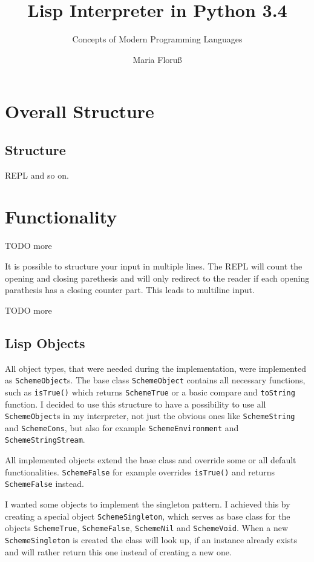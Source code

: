 \documentclass[12pt,a4paper]{scrartcl}
\begin{document}
\title{Lisp Interpreter in Python 3.4}
\subtitle{Concepts of Modern Programming Languages}
\author{Maria Floru\ss}
\maketitle
\newpage

\section*{Overall Structure}

\subsection*{Structure}
REPL and so on.

\section*{Functionality}

TODO more

It is possible to structure your input in multiple lines. The REPL will count the opening and closing parethesis and will only redirect to the reader if each opening parathesis has a closing counter part. This leads to multiline input.

TODO more

\subsection*{Lisp Objects}
All object types, that were needed during the implementation, were implemented as \lstinline{SchemeObject}s. The base class \lstinline{SchemeObject} contains all necessary functions, such as \lstinline{isTrue()} which returns \lstinline{SchemeTrue} or a basic compare and \lstinline{toString} function. I decided to use this structure to have a possibility to use all \lstinline{SchemeObject}s in my interpreter, not just the obvious ones like \lstinline{SchemeString} and \lstinline{SchemeCons}, but also for example \lstinline{SchemeEnvironment} and \lstinline{SchemeStringStream}. 

All implemented objects extend the base class and override some or all default functionalities. \lstinline{SchemeFalse} for example overrides \lstinline{isTrue()} and returns \lstinline{SchemeFalse} instead.

I wanted some objects to implement the singleton pattern. I achieved this by creating a special object \lstinline{SchemeSingleton}, which serves as base class for the objects \lstinline{SchemeTrue}, \lstinline{SchemeFalse}, \lstinline{SchemeNil} and \lstinline{SchemeVoid}. When a new \lstinline{SchemeSingleton} is created the class will look up, if an instance already exists and will rather return this one instead of creating a new one. 
\end{document}
